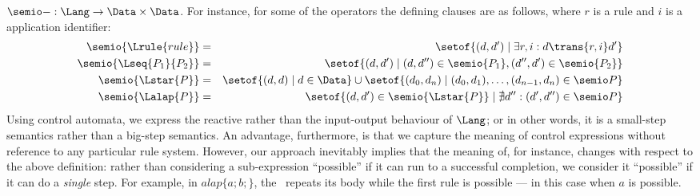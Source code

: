 $\semio-:\Lang\rightarrow \Data\times \Data$. For instance, for some of the
operators the defining clauses are as follows, where $r$ is a rule and $i$ is a application identifier:
%
\begin{eqnarray*}
\semio{\Lrule{rule}}
   & = & \setof{(d,d')\mid \exists r,i: d\trans{r,i} d'} \\
\semio{\Lseq{P_1}{P_2}}
   & = & \setof{(d,d')\mid
                (d,d'')\in \semio{P_1}, (d'',d')\in \semio{P_2}} \\
\semio{\Lstar{P}}
   & = & \setof{(d,d) \mid d\in \Data} \cup
         \setof{(d_0,d_n)\mid (d_0,d_1),\ldots,(d_{n-1},d_n)\in \semio P} \\
\semio{\Lalap{P}}
   & = & \setof{(d,d')\in \semio{\Lstar{P}} \mid
                          \nexists d'': (d',d'')\in \semio P} 
\end{eqnarray*}
%
Using control automata, we express the reactive rather than the input-output
behaviour of $\Lang$; or in other words, it is a small-step semantics rather
than a big-step semantics. An advantage, furthermore, is that we capture the
meaning of control expressions without reference to any particular rule system.
However, our approach inevitably implies that the meaning of, for instance,
\alapK{} changes with respect to the above definition: rather than considering
a sub-expression ``possible'' if it can run to a successful completion, we
consider it ``possible'' if it can do a \emph{single} step. For example, in $alap\{a;b;\}$, the \Lalap~repeats its body while the first rule is possible --- in this case when $a$ is possible.

